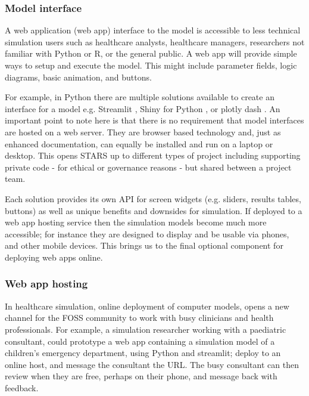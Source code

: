 \documentclass[]{interact}
\theoremstyle{plain}%
\theoremstyle{definition}
\theoremstyle{remark}
\begin{document}
\subsubsection{Model interface}

A web application (web app) interface to the model is accessible to less technical simulation users such as healthcare analysts, healthcare managers, researchers not familiar with Python or R, or the general public. A web app will provide simple ways to setup and execute the model. This might include parameter fields, logic diagrams, basic animation, and buttons.   

For example, in Python there are multiple solutions available to create an interface for a model e.g. Streamlit \citep{streamlit}, Shiny for Python \citep{shinypy}, or plotly dash \citep{shammamah_hossain-proc-scipy-2019}. An important point to note here is that there is no requirement that model interfaces are hosted on a web server. They are browser based technology and, just as enhanced documentation, can equally be installed and run on a laptop or desktop. This opens STARS up to different types of project including supporting private code - for ethical or governance reasons - but shared between a project team.  

Each solution provides its own API for screen widgets (e.g. sliders, results tables, buttons) as well as unique benefits and downsides for simulation.  
If deployed to a web app hosting service then the simulation models become much more accessible; for instance they are designed to display and be usable via phones, and other mobile devices. This brings us to the final optional component for deploying web apps online.  

\subsubsection{Web app hosting}

In healthcare simulation, online deployment of computer models, opens a new channel for the FOSS community to work with busy clinicians and health professionals.  For example, a simulation researcher working with a paediatric consultant, could prototype a web app containing a simulation model of a children's emergency department, using Python and streamlit; deploy to an online host, and message the consultant the URL. The busy consultant can then review when they are free, perhaps on their phone, and message back with feedback.
\end{document}
